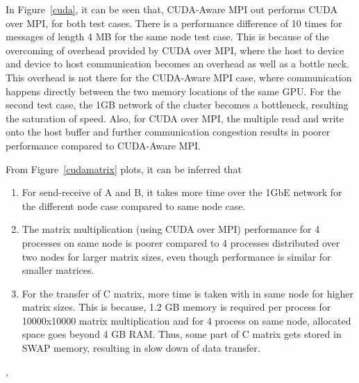\documentclass[10pt]{article}
\begin{document}
In Figure~\ref{cuda}, it can be seen that, CUDA-Aware MPI out performs CUDA over MPI, for both test cases. There is a performance difference of  10 times for messages of length 4 MB for the same node test case. This is because of the overcoming of overhead provided by CUDA over MPI, where the host to device and device  to host communication becomes an overhead as well as a bottle neck. This overhead is not there for the CUDA-Aware MPI case, where communication happens directly between the two memory locations of the same GPU.  For the second test case, the 1GB network of the cluster becomes a bottleneck, resulting the saturation of speed. Also, for CUDA over MPI, the multiple read and write onto the host buffer and further communication congestion results in poorer performance compared to CUDA-Aware MPI.

From Figure~\ref{cudamatrix} plots, it can be inferred that
\begin{enumerate}
\item For send-receive of A and B, it takes more time over the 1GbE network for the different node case compared to same node case.
\item The matrix multiplication (using CUDA over MPI) performance for 4 processes on same node is poorer compared to 4 processes distributed over two nodes for larger matrix sizes, even though performance is similar for smaller matrices. 
\item For the transfer of C matrix, more time is taken with in same node for higher matrix sizes.  This is  because, 1.2 GB memory is required per process for 10000x10000 matrix multiplication and for 4 process on same node, allocated space goes beyond 4 GB RAM. Thus, some part of C matrix gets stored in SWAP memory, resulting in slow down of data transfer.
\end{enumerate}

, 


{}

\end{document}
